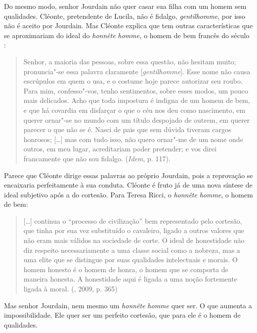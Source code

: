 Do mesmo modo, senhor Jourdain não quer casar sua filha com um homem sem
qualidades. Cléonte, pretendente de Lucila, não é fidalgo,
\emph{gentilhomme}, por isso não é aceito por Jourdain. Mas Cléonte
explica que tem outras características que se aproximariam do ideal do
\emph{honnête} \emph{homme,} o homem de bem francês do século :

\begin{quote}
Senhor, a maioria das pessoas, sobre essa questão, não hesitam muito;
pronuncia"-se essa palavra claramente [\emph{gentilhomme}]. Esse nome
não causa escrúpulos em quem o usa, e o costume hoje parece autorizar
seu roubo. Para mim, confesso"-vos, tenho sentimentos, sobre esses modos,
um pouco mais delicados. Acho que toda impostura é indigna de um homem
de bem, e que há covardia em disfarçar o que o céu nos deu como
nascimento, em querer ornar"-se no mundo com um título despojado de
outrem, em querer parecer o que não se é. Nasci de pais que sem dúvida
tiveram cargos honrosos; [\ldots{}] mas com tudo isso, não quero
ornar"-me de um nome onde outros, em meu lugar, acreditariam poder
pretender; e vos direi francamente que não sou fidalgo. (\emph{Idem}, p.
117).
\end{quote}

Parece que Cléonte dirige essas palavras ao próprio Jourdain, pois a
reprovação se encaixaria perfeitamente à sua conduta. Cléonte é fruto já
de uma nova síntese de ideal subjetivo após a do cortesão. Para Teresa
Ricci, o \emph{honnête} \emph{homme}, o homem de bem:

\begin{quote}
[\ldots{}] continua o ``processo de civilização'' bem representado pelo
cortesão, que tinha por sua vez substituído o cavaleiro, ligado a outros
valores que não eram mais válidos na sociedade de corte. O ideal de
honestidade não diz respeito necessariamente a uma classe social como a
nobreza, mas a uma elite que se distingue por suas qualidades
intelectuais e morais. O homem honesto é o homem de honra, o homem que
se comporta de maneira honesta. A honestidade aqui é ligada a uma noção
fortemente ligada à moral. (, 2009, p. 365)
\end{quote}

Mas senhor Jourdain, nem mesmo um \emph{honnête} \emph{homme} quer ser.
O que aumenta a impossibilidade. Ele quer ser um perfeito cortesão, que
para ele é o homem de qualidades.

